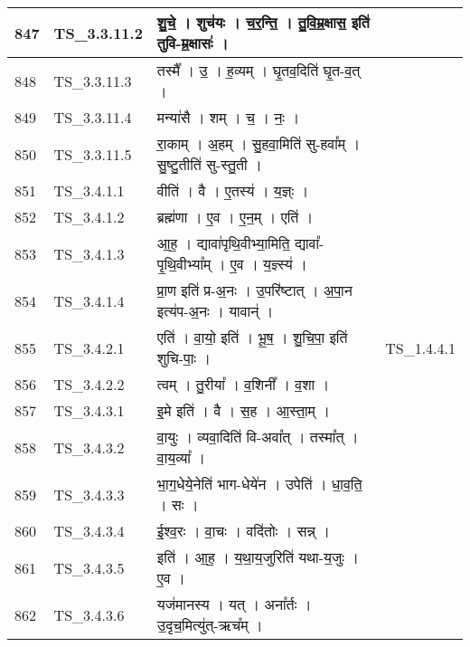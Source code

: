 \documentclass[17pt]{extarticle}
\begin{document}
\begin{longtable}{||p{0.4in}||p{0.9in}||p{4.0in}||p{0.9in}||}
        \hline
            847 & TS\_3.3.11.2 & शु॒चे॒   ।   शुच॑यः   ।   च॒र॒न्ति॒   ।   तु॒वि॒म्र॒क्षास॒ इति॑ तुवि{-}म्र॒क्षासः॑   ।    &      \\
        \hline
            848 & TS\_3.3.11.3 & तस्मै᳚   ।   उ॒   ।   ह॒व्यम्   ।   घृ॒तव॒दिति॑ घृ॒त{-}व॒त्   ।    &      \\
        \hline
            849 & TS\_3.3.11.4 & मन्या॑सै   ।   शम्   ।   च॒   ।   नः॒   ।    &      \\
        \hline
            850 & TS\_3.3.11.5 & रा॒काम्   ।   अ॒हम्   ।   सु॒हवा॒मिति॑ सु{-}हवा᳚म्   ।   सु॒ष्टु॒तीति॑ सु{-}स्तु॒ती   ।    &      \\
        \hline
            851 & TS\_3.4.1.1 & वीति॑   ।   वै   ।   ए॒तस्य॑   ।   य॒ज्ञ्ः   ।    &      \\
        \hline
            852 & TS\_3.4.1.2 & ब्रह्म॑णा   ।   ए॒व   ।   ए॒न॒म्   ।   एति॑   ।    &      \\
        \hline
            853 & TS\_3.4.1.3 & आ॒ह॒   ।   द्यावा॑पृथि॒वीभ्या॒मिति॒ द्यावा᳚{-}पृ॒थि॒वीभ्या᳚म्   ।   ए॒व   ।   य॒ज्ञ्स्य॑   ।    &      \\
        \hline
            854 & TS\_3.4.1.4 & प्रा॒ण इति॑ प्र{-}अ॒नः   ।   उ॒परि॑ष्टात्   ।   अ॒पा॒न इत्य॑प{-}अ॒नः   ।   यावान्॑   ।    &      \\
        \hline
            855 & TS\_3.4.2.1 & एति॑   ।   वा॒यो॒ इति॑   ।   भू॒ष॒   ।   शु॒चि॒पा॒ इति॑ शुचि{-}पाः॒   ।    & TS\_1.4.4.1        \\
        \hline
            856 & TS\_3.4.2.2 & त्वम्   ।   तु॒रीया᳚   ।   व॒शिनी᳚   ।   व॒शा   ।    &      \\
        \hline
            857 & TS\_3.4.3.1 & इ॒मे इति॑   ।   वै   ।   स॒ह   ।   आ॒स्ता॒म्   ।    &      \\
        \hline
            858 & TS\_3.4.3.2 & वा॒युः   ।   व्यवा॒दिति॑ वि{-}अवा᳚त्   ।   तस्मा᳚त्   ।   वा॒य॒व्या᳚   ।    &      \\
        \hline
            859 & TS\_3.4.3.3 & भा॒ग॒धेये॒नेति॑ भाग{-}धेये॑न   ।   उपेति॑   ।   धा॒व॒ति॒   ।   सः   ।    &      \\
        \hline
            860 & TS\_3.4.3.4 & ई॒श्व॒रः   ।   वा॒चः   ।   वदि॑तोः   ।   सन्न्   ।    &      \\
        \hline
            861 & TS\_3.4.3.5 & इति॑   ।   आ॒ह॒   ।   य॒था॒य॒जुरिति॑ यथा{-}य॒जुः   ।   ए॒व   ।    &      \\
        \hline
            862 & TS\_3.4.3.6 & यज॑मानस्य   ।   यत्   ।   अना᳚र्तः   ।   उ॒दृच॒मित्यु॑त्{-}ऋच᳚म्   ।    &      \\

\end{longtable}
\end{document}
